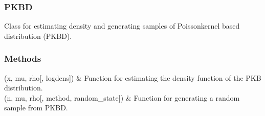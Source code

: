 \documentclass[letterpaper,10pt,english,openany,oneside]{sphinxmanual}
\begin{document}
\sphinxstepscope


\subsubsection{PKBD}
\label{\detokenize{api_reference/generated/QuadratiK.spherical_clustering.PKBD:pkbd}}\label{\detokenize{api_reference/generated/QuadratiK.spherical_clustering.PKBD::doc}}

\begin{fulllineitems}
\label{\detokenize{api_reference/generated/QuadratiK.spherical_clustering.PKBD:QuadratiK.spherical_clustering.PKBD}}
\pysigstartsignatures
{}
\pysigstopsignatures
\sphinxAtStartPar
Class for estimating density and generating samples of Poisson\sphinxhyphen{}kernel based distribution (PKBD).

\end{fulllineitems}

\subsubsection*{Methods}


\begin{savenotes}\sphinxattablestart
\sphinxthistablewithglobalstyle
\sphinxthistablewithnovlinesstyle
\centering
\begin{tabulary}{\linewidth}[t]{}
\sphinxtoprule
\sphinxtableatstartofbodyhook
\sphinxAtStartPar
{\hyperref[\detokenize{api_reference/generated/QuadratiK.spherical_clustering.PKBD:QuadratiK.spherical_clustering.PKBD.dpkb}]{}}(x, mu, rho{[}, logdens{]})
&
\sphinxAtStartPar
Function for estimating the density function of the PKB distribution.
\\
\sphinxhline
\sphinxAtStartPar
{\hyperref[\detokenize{api_reference/generated/QuadratiK.spherical_clustering.PKBD:QuadratiK.spherical_clustering.PKBD.rpkb}]{}}(n, mu, rho{[}, method, random\_state{]})
&
\sphinxAtStartPar
Function for generating a random sample from PKBD.
\\
\sphinxbottomrule
\end{tabulary}
\sphinxtableafterendhook\par
\sphinxattableend\end{savenotes}
\end{document}
